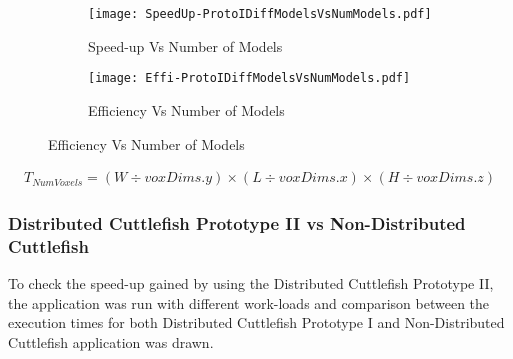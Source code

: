 \begin{figure}
\centering
\captionsetup[subfigure]{labelformat=empty}
\begin{subfigure}
\centering
\texttt{[image: SpeedUp-ProtoIDiffModelsVsNumModels.pdf]}
\caption{Speed-up Vs Number of Models}
\label{fig:SpeedUp-ProtoIDiffModelsVsNumModels}
\end{subfigure}
\begin{subfigure}
\centering
\texttt{[image: Effi-ProtoIDiffModelsVsNumModels.pdf]}
\caption{Efficiency Vs Number of Models}
\label{ProtoIDiffModelsVsNumModels}
\end{subfigure}
\end{figure}


\begin{equation}
\label{eq:NumVoxel}
\begin{aligned}
T_{NumVoxels} = (W\div voxDims.y) \times (L\div voxDims.x) \times (H \div voxDims.z)
\end{aligned}
\end{equation}


\subsubsection{Distributed Cuttlefish Prototype II vs Non-Distributed Cuttlefish}
To check the speed-up gained by using the Distributed Cuttlefish Prototype II, the application was run with different work-loads and comparison between the execution times for both Distributed Cuttlefish Prototype I and Non-Distributed Cuttlefish application was drawn.

